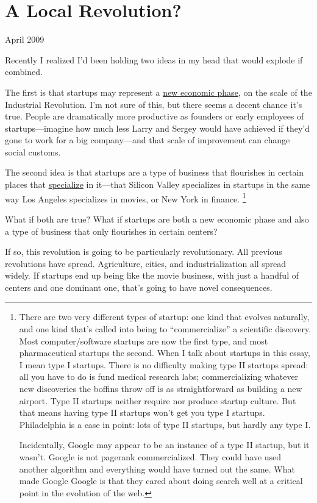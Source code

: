 \chapter{A Local Revolution?}

April 2009

Recently I realized I'd been holding two ideas in my head that would
explode if combined.

The first is that startups may represent a \href{highres.html}{new
economic phase}, on the scale of the Industrial Revolution. I'm not sure
of this, but there seems a decent chance it's true. People are
dramatically more productive as founders or early employees of
startups---imagine how much less Larry and Sergey would have achieved if
they'd gone to work for a big company---and that scale of improvement
can change social customs.

The second idea is that startups are a type of business that flourishes
in certain places that \href{startuphubs.html}{specialize} in it---that
Silicon Valley specializes in startups in the same way Los Angeles
specializes in movies, or New York in finance. \footnote{There are two very different types of startup: one kind that
evolves naturally, and one kind that's called into being to
``commercialize'' a scientific discovery. Most computer/software
startups are now the first type, and most pharmaceutical startups the
second. When I talk about startups in this essay, I mean type I
startups. There is no difficulty making type II startups spread: all you
have to do is fund medical research labs; commercializing whatever new
discoveries the boffins throw off is as straightforward as building a
new airport. Type II startups neither require nor produce startup
culture. But that means having type II startups won't get you type I
startups. Philadelphia is a case in point: lots of type II startups, but
hardly any type I.

Incidentally, Google may appear to be an instance of a type II startup,
but it wasn't. Google is not pagerank commercialized. They could have
used another algorithm and everything would have turned out the same.
What made Google Google is that they cared about doing search well at a
critical point in the evolution of the web.}

What if both are true? What if startups are both a new economic phase
and also a type of business that only flourishes in certain centers?

If so, this revolution is going to be particularly revolutionary. All
previous revolutions have spread. Agriculture, cities, and
industrialization all spread widely. If startups end up being like the
movie business, with just a handful of centers and one dominant one,
that's going to have novel consequences.

